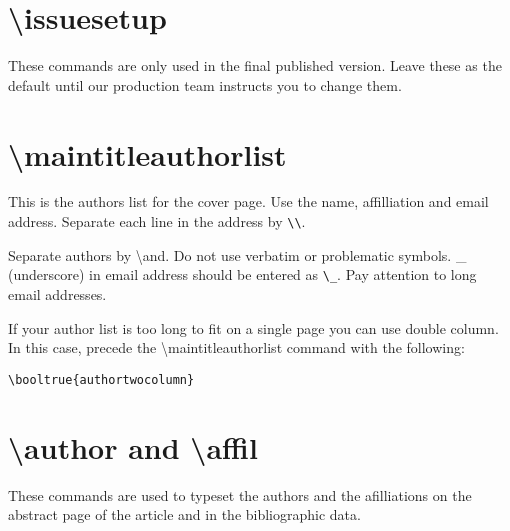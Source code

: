 \documentclass[examplefnt,biber]{nowfnt} %
\begin{document}
\section{\textbackslash issuesetup}
These commands are only used in the final published version. Leave these as the
default until our production team instructs you to change them.
%


\section{\textbackslash maintitleauthorlist}
This is the authors list for the cover page. Use the name, affilliation and email address.
Separate each line in the address by \verb+\\+.


Separate authors by \textbackslash and.
 Do not use verbatim or problematic symbols.
\_ (underscore) in email address should be entered as \verb+\_+.
 Pay attention to long email addresses.

If your author list is too long to fit on a single page 
you can use double column.
In this case, precede the {\textbackslash maintitleauthorlist} command with the following:
\begin{verbatim}
\booltrue{authortwocolumn} 
\end{verbatim}

\section{\textbackslash author and \textbackslash affil}
These commands are used to typeset the authors and the afilliations on the 
abstract page of the article and in the bibliographic data.
\end{document}
